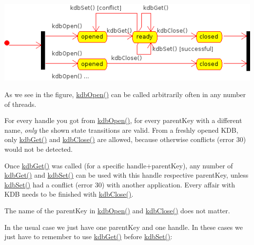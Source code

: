 \begin{DoxyImage}
\includegraphics[width=\textwidth,height=\textheight/2,keepaspectratio=true]{state.png}
\end{DoxyImage}
 As we see in the figure, \hyperlink{group__kdb_ga6808defe5870f328dd17910aacbdc6ca}{kdb\+Open()} can be called arbitrarily often in any number of threads.

For every handle you got from \hyperlink{group__kdb_ga6808defe5870f328dd17910aacbdc6ca}{kdb\+Open()}, for every parent\+Key with a different name, {\itshape only} the shown state transitions are valid. From a freshly opened K\+DB, only \hyperlink{group__kdb_ga28e385fd9cb7ccfe0b2f1ed2f62453a1}{kdb\+Get()} and \hyperlink{group__kdb_gadb54dc9fda17ee07deb9444df745c96f}{kdb\+Close()} are allowed, because otherwise conflicts (error 30) would not be detected.

Once \hyperlink{group__kdb_ga28e385fd9cb7ccfe0b2f1ed2f62453a1}{kdb\+Get()} was called (for a specific handle+parent\+Key), any number of \hyperlink{group__kdb_ga28e385fd9cb7ccfe0b2f1ed2f62453a1}{kdb\+Get()} and \hyperlink{group__kdb_ga11436b058408f83d303ca5e996832bcf}{kdb\+Set()} can be used with this handle respective parent\+Key, unless \hyperlink{group__kdb_ga11436b058408f83d303ca5e996832bcf}{kdb\+Set()} had a conflict (error 30) with another application. Every affair with K\+DB needs to be finished with \hyperlink{group__kdb_gadb54dc9fda17ee07deb9444df745c96f}{kdb\+Close()}.

The name of the parent\+Key in \hyperlink{group__kdb_ga6808defe5870f328dd17910aacbdc6ca}{kdb\+Open()} and \hyperlink{group__kdb_gadb54dc9fda17ee07deb9444df745c96f}{kdb\+Close()} does not matter.

In the usual case we just have one parent\+Key and one handle. In these cases we just have to remember to use \hyperlink{group__kdb_ga28e385fd9cb7ccfe0b2f1ed2f62453a1}{kdb\+Get()} before \hyperlink{group__kdb_ga11436b058408f83d303ca5e996832bcf}{kdb\+Set()}\+:


